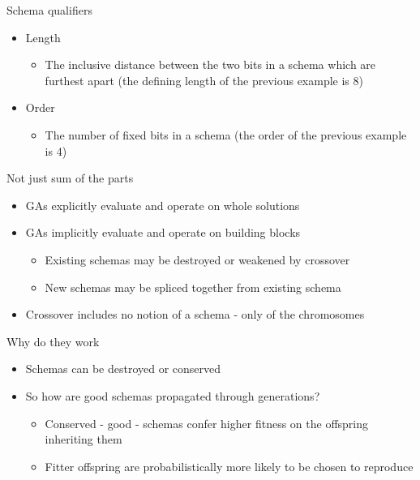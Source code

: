 \documentclass[%
pdf,
colorBG,
slideColor,
tcrico,
]{prosper}
\begin{document}

\begin{slide}{ Schema qualifiers}  
\begin{itemize}
\item Length
\begin{itemize}
	\item The inclusive distance between the two bits in a schema which are furthest apart (the defining length of the previous example is 8)
\end{itemize}
\item Order
\begin{itemize}
\item The number of fixed bits in a schema (the order of the previous example is 4) 
\end{itemize}
\end{itemize}

\end{slide}


\begin{slide}{ Not just sum of the parts }  
\begin{itemize}
\item GAs explicitly evaluate and operate on whole solutions
\item GAs implicitly evaluate and operate on building blocks
\begin{itemize}
	\item Existing schemas may be destroyed or weakened by crossover
	\item New schemas may be spliced together from existing schema
\end{itemize}
\item Crossover includes no notion of a schema - only of the chromosomes
\end{itemize}

\end{slide}


\begin{slide}{Why do they work}
\begin{itemize}
 \item Schemas can be destroyed or conserved
\item So how are good schemas propagated through generations?
\begin{itemize}
	\item Conserved - good - schemas confer higher fitness on the offspring inheriting them
	\item Fitter offspring are probabilistically more likely to be chosen to reproduce 
\end{itemize}
\end{itemize}

\end{slide}
\end{document}

